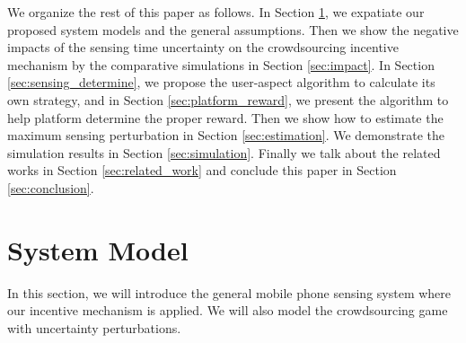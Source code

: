 \documentclass{IEEEtran}
\begin{document}
We organize the rest of this paper as follows. In Section \ref{sec:system_model}, we expatiate our proposed system models and the general assumptions. %
Then we show the negative impacts of the sensing {\color{black}time} uncertainty on the crowdsourcing incentive mechanism by the comparative simulations in Section \ref{sec:impact}. In Section \ref{sec:sensing_determine}, we propose the user-aspect algorithm to calculate its own strategy, and in Section \ref{sec:platform_reward}, we present the algorithm to help platform determine the proper reward. Then we show how to estimate the maximum sensing perturbation in Section \ref{sec:estimation}. We demonstrate the simulation results in Section \ref{sec:simulation}. Finally we talk about the related works in Section \ref{sec:related_work} and conclude this paper in Section \ref{sec:conclusion}. %

\section{System Model}
\label{sec:system_model}
In this section, we will introduce the general mobile phone sensing system where our incentive mechanism is applied. We will also model the crowdsourcing game with uncertainty perturbations.  %
\end{document}

